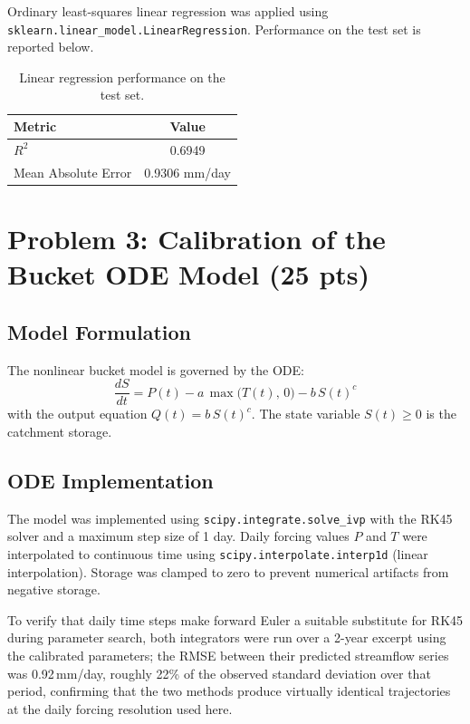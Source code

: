\documentclass[11pt,letterpaper]{article}
\begin{document}
Ordinary least-squares linear regression was applied using \texttt{sklearn.linear\_model.LinearRegression}. Performance on the test set is reported below.

\begin{table}[H]
\centering
\caption{Linear regression performance on the test set.}
\label{tab:lr}
\begin{tabular}{lc}
\toprule
\textbf{Metric} & \textbf{Value} \\
\midrule
$R^2$                  & 0.6949 \\
Mean Absolute Error    & 0.9306 mm/day \\
\bottomrule
\end{tabular}
\end{table}

\clearpage
\section{Problem 3: Calibration of the Bucket ODE Model (25 pts)}

\subsection{Model Formulation}

The nonlinear bucket model is governed by the ODE:
\begin{equation}
    \frac{dS}{dt} = P(t) - a\,\max\bigl(T(t),\,0\bigr) - b\,S(t)^{c}
    \label{eq:ode}
\end{equation}
with the output equation $Q(t) = b\,S(t)^{c}$. The state variable $S(t) \geq 0$ is the catchment storage.

\subsection{ODE Implementation}

The model was implemented using \texttt{scipy.integrate.solve\_ivp} with the RK45 solver and a maximum step size of 1 day. Daily forcing values $P$ and $T$ were interpolated to continuous time using \texttt{scipy.interpolate.interp1d} (linear interpolation). Storage was clamped to zero to prevent numerical artifacts from negative storage.

To verify that daily time steps make forward Euler a suitable substitute for RK45 during parameter search, both integrators were run over a 2-year excerpt using the calibrated parameters; the RMSE between their predicted streamflow series was 0.92\,mm/day, roughly 22\% of the observed standard deviation over that period, confirming that the two methods produce virtually identical trajectories at the daily forcing resolution used here.
\end{document}
